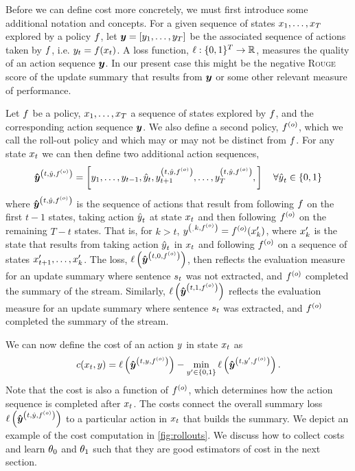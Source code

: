 Before we can define cost more concretely, we must first introduce some
additional notation and concepts.  For a given sequence of states
$x_1,\ldots,x_T$ explored by a policy $f$, let $\boldsymbol{y}=
\left[y_1,\ldots,y_T\right]$ be the associated sequence of actions
taken by $f$, i.e. $y_t = f(x_t)$.  A loss function,
$\ell : \{0,1\}^T \rightarrow \mathbb{R}$, measures the quality of an action
sequence $\boldsymbol{y}$. In our present case this might be the negative
\textsc{Rouge} score of the update summary that results from $\boldsymbol{y}$ or some
other relevant measure of performance. 

Let $f$ be a policy, $x_1,\ldots,x_T$ a sequence of states
explored by $f$, and the corresponding action sequence $\boldsymbol{y}$. We also
define a second policy, $f^{(o)}$, which we call the roll-out policy and
which may or may not be distinct from $f$.  For any state $x_t$ we
can then define two additional action sequences,
\[
    \boldsymbol{\hat{\boldsymbol{y}}}^{\left(t,\hat{y},f^{(o)}\right)} = \left[
        y_1, 
        \ldots, 
        y_{t-1},
        \hat{y}_t,
        y^{\left(t,\hat{y},f^{(o)}\right)}_{t+1}, 
        \ldots, 
        y^{\left(t,\hat{y},f^{(o)}\right)}_{T}, 
    \right] \quad \forall {\hat{y}}_t \in \{0,1\} 
\] 
where $\boldsymbol{\hat{\boldsymbol{y}}}^{\left(t,\hat{y},f^{(o)}\right)}$ is the sequence of actions that result from following
$f$ on the first $t-1$ states, taking action ${\hat{y}}_t$ at state
$x_t$ and then following $f^{(o)}$ on the remaining $T - t$ states.
That is, for $k > t$, $y^{\left(_,k,f^{(o)}\right)} = f^{(o)}(x^\prime_k)$, where
$x^\prime_k$ is the state that results from taking action ${\hat{y}}_t$ in
$x_t$ and following $f^{(o)}$ on a sequence of states
$x^\prime_{t+1}, \ldots, x^\prime_k$. The loss, $\ell\left(
\boldsymbol{\hat{\boldsymbol{y}}}^{\left(t,0,f^{(o)}\right)} \right)$, then reflects the evaluation measure for an update
summary where sentence $s_t$ was not extracted, and $f^{(o)}$
completed the summary of the stream. Similarly, $\ell\left( \boldsymbol{\hat{\boldsymbol{y}}}^{\left(t,1,f^{(o)}\right)}
\right)$ reflects the evaluation measure for an update summary where sentence
$s_t$ was extracted, and $f^{(o)}$ completed the summary of the
stream. 
 
We can now define the cost of an action $y$ in state $x_t$ as 
\[ 
    c(x_t, y) = 
        \ell\left(\boldsymbol{\hat{\boldsymbol{y}}}^{\left(t,y,f^{(o)}\right)}   \right) 
            - \min_{y^\prime \in \{0,1\} }
                \ell\left( \boldsymbol{\hat{\boldsymbol{y}}}^{\left(t,y^\prime,f^{(o)}\right)} \right).
\]
Note that the cost is also a function of $f^{(o)}$, which determines how
the action sequence is completed after $x_t$.  The costs connect the
overall summary loss $\ell\left(\boldsymbol{\hat{\boldsymbol{y}}}^{\left(t,\hat{y},f^{(o)}\right)}\right)$ to a particular action in
$x_t$ that builds the summary.  We depict an example of the cost
computation in \autoref{fig:rollouts}.  We discuss how to collect costs and
learn $\theta_0$ and $\theta_1$ such that they are good estimators of cost in
the next section.

